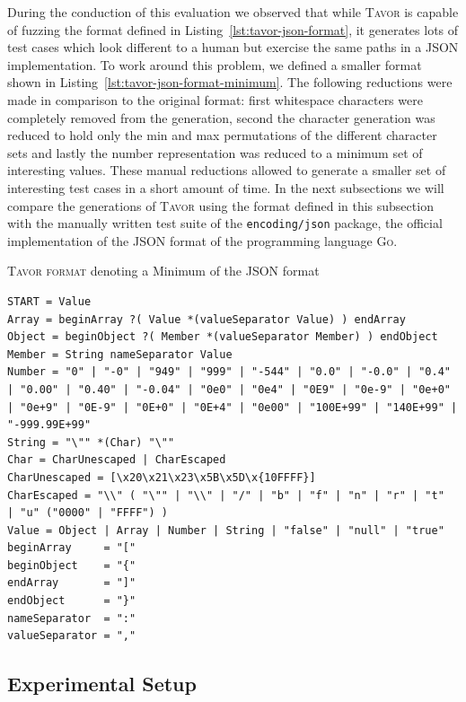 During the conduction of this evaluation we observed that while \textsc{Tavor} is capable of fuzzing the format defined in Listing~\ref{lst:tavor-json-format}, it generates lots of test cases which look different to a human but exercise the same paths in a JSON implementation. To work around this problem, we defined a smaller format shown in Listing~\ref{lst:tavor-json-format-minimum}. The following reductions were made in comparison to the original format: first whitespace characters were completely removed from the generation, second the character generation was reduced to hold only the min and max permutations of the different character sets and lastly the number representation was reduced to a minimum set of interesting values. These manual reductions allowed to generate a smaller set of interesting test cases in a short amount of time. In the next subsections we will compare the generations of \textsc{Tavor} using the format defined in this subsection with the manually written test suite of the \texttt{encoding/json} package, the official implementation of the JSON format of the programming language \textsc{Go}.

\begin{listing}
\caption{\textsc{Tavor format} denoting a Minimum of the JSON format}
\label{lst:tavor-json-format-minimum}
\begin{verbatim}
START = Value
Array = beginArray ?( Value *(valueSeparator Value) ) endArray
Object = beginObject ?( Member *(valueSeparator Member) ) endObject
Member = String nameSeparator Value
Number = "0" | "-0" | "949" | "999" | "-544" | "0.0" | "-0.0" | "0.4" | "0.00" | "0.40" | "-0.04" | "0e0" | "0e4" | "0E9" | "0e-9" | "0e+0" | "0e+9" | "0E-9" | "0E+0" | "0E+4" | "0e00" | "100E+99" | "140E+99" | "-999.99E+99"
String = "\"" *(Char) "\""
Char = CharUnescaped | CharEscaped
CharUnescaped = [\x20\x21\x23\x5B\x5D\x{10FFFF}]
CharEscaped = "\\" ( "\"" | "\\" | "/" | "b" | "f" | "n" | "r" | "t"  | "u" ("0000" | "FFFF") )
Value = Object | Array | Number | String | "false" | "null" | "true"
beginArray     = "["
beginObject    = "{"
endArray       = "]"
endObject      = "}"
nameSeparator  = ":"
valueSeparator = ","
\end{verbatim}
\end{listing}

\subsection{Experimental Setup}
\label{subsec:evaluationJSONExperimentalSetup}

